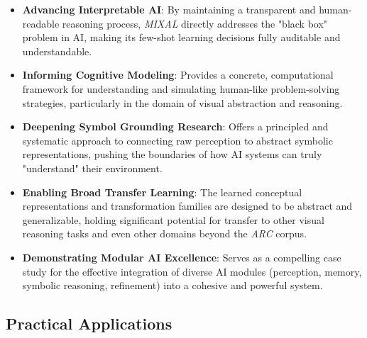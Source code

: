 \documentclass[12pt]{article}
\newcommand{\arc}{\textit{ARC}}
\newcommand{\MIXAL}{\textit{MIXAL}}
\begin{document}
\begin{itemize}[noitemsep,topsep=0pt]
\item\textbf{Advancing Interpretable AI}: By maintaining a transparent and human-readable reasoning process, \MIXAL{} directly addresses the "black box" problem in AI, making its few-shot learning decisions fully auditable and understandable.
\item\textbf{Informing Cognitive Modeling}: Provides a concrete, computational framework for understanding and simulating human-like problem-solving strategies, particularly in the domain of visual abstraction and reasoning.
\item\textbf{Deepening Symbol Grounding Research}: Offers a principled and systematic approach to connecting raw perception to abstract symbolic representations, pushing the boundaries of how AI systems can truly "understand" their environment.
\item\textbf{Enabling Broad Transfer Learning}: The learned conceptual representations and transformation families are designed to be abstract and generalizable, holding significant potential for transfer to other visual reasoning tasks and even other domains beyond the \arc{} corpus.
\item\textbf{Demonstrating Modular AI Excellence}: Serves as a compelling case study for the effective integration of diverse AI modules (perception, memory, symbolic reasoning, refinement) into a cohesive and powerful system.
\end{itemize}

\subsection{Practical Applications}
\end{document}
